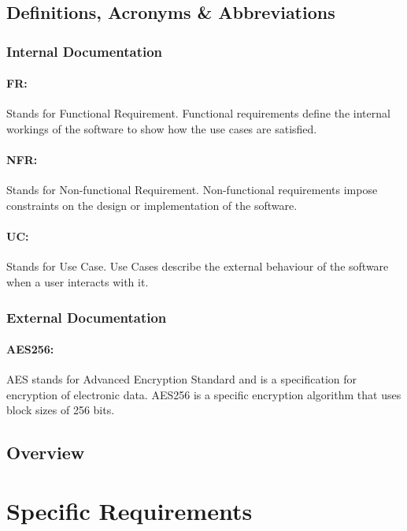 \documentclass[11pt]{article}
\begin{document}
\subsection{Definitions, Acronyms \& Abbreviations}
\subsubsection{Internal Documentation}
\paragraph{FR:} Stands for Functional Requirement. Functional requirements define the internal workings of the software to show how the use cases are satisfied.
\paragraph{NFR:} Stands for Non-functional Requirement. Non-functional requirements impose constraints on the design or implementation of the software.
\paragraph{UC:} Stands for Use Case. Use Cases describe the external behaviour of the software when a user interacts with it.
\subsubsection{External Documentation}
\paragraph{AES256:} AES stands for Advanced Encryption Standard and is a specification for encryption of electronic data. AES256 is a specific encryption algorithm that uses block sizes of 256 bits.
\subsection{Overview}

\section{Specific Requirements}
\end{document}
